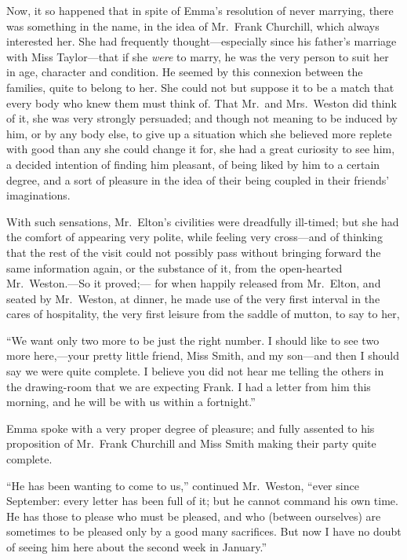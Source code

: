 Now, it so happened that in spite of Emma's resolution of never marrying,
there was something in the name, in the idea of Mr.\ Frank Churchill,
which always interested her.  She had frequently thought---especially since
his father's marriage with Miss Taylor---that if she \emph{were} to marry,
he was the very person to suit her in age, character and condition.
He seemed by this connexion between the families, quite to belong to her.
She could not but suppose it to be a match that every body who knew
them must think of.  That Mr.\ and Mrs.\ Weston did think of it, she was
very strongly persuaded; and though not meaning to be induced by him,
or by any body else, to give up a situation which she believed more
replete with good than any she could change it for, she had a great
curiosity to see him, a decided intention of finding him pleasant,
of being liked by him to a certain degree, and a sort of pleasure
in the idea of their being coupled in their friends' imaginations.

With such sensations, Mr.\ Elton's civilities were dreadfully ill-timed;
but she had the comfort of appearing very polite, while feeling
very cross---and of thinking that the rest of the visit could not
possibly pass without bringing forward the same information again,
or the substance of it, from the open-hearted Mr.\ Weston.---So it proved;---%
for when happily released from Mr.\ Elton, and seated by Mr.\ Weston,
at dinner, he made use of the very first interval in the cares
of hospitality, the very first leisure from the saddle of mutton,
to say to her,

``We want only two more to be just the right number.  I should
like to see two more here,---your pretty little friend, Miss Smith,
and my son---and then I should say we were quite complete.
I believe you did not hear me telling the others in the drawing-room
that we are expecting Frank.  I had a letter from him this morning,
and he will be with us within a fortnight.''

Emma spoke with a very proper degree of pleasure; and fully assented
to his proposition of Mr.\ Frank Churchill and Miss Smith making
their party quite complete.

``He has been wanting to come to us,'' continued Mr.\ Weston,
``ever since September:  every letter has been full of it;
but he cannot command his own time.  He has those to please
who must be pleased, and who (between ourselves) are sometimes
to be pleased only by a good many sacrifices.  But now
I have no doubt of seeing him here about the second week in January.''

